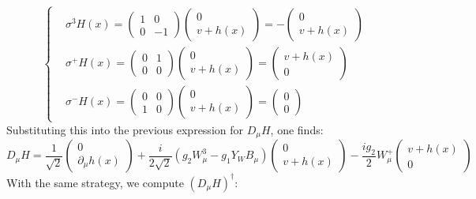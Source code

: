 \documentclass[../main.tex]{subfiles}
\begin{document}
\[
\left\{
\begin{aligned}
&\sigma^3H(x)=\left(\begin{array}{cc}
    1 & 0 \\
    0 & -1
\end{array}\right)\left(\begin{array}{c}
  0 \\
  v+h(x)
\end{array}\right)=-\left(\begin{array}{c}
  0 \\
  v+h(x)
\end{array}\right) \\
&\sigma^+H(x)=\left(\begin{array}{cc}
    0 & 1 \\
    0 & 0
\end{array}\right)\left(\begin{array}{c}
  0 \\
  v+h(x)
\end{array}\right)=\left(\begin{array}{c}
  v+h(x) \\
  0
\end{array}\right) \\
&\sigma^-H(x)=\left(\begin{array}{cc}
    0 & 0 \\
    1 & 0
\end{array}\right)\left(\begin{array}{c}
  0 \\
  v+h(x)
\end{array}\right)=\left(\begin{array}{c}
  0 \\
  0
\end{array}\right)
\end{aligned}
\right.
\]
Substituting this into the previous expression for $D_\mu H$, one finds:
\[
D_\mu H=\frac{1}{\sqrt{2}}\begin{pmatrix}0 \\ \partial_\mu h(x)\end{pmatrix}+\frac{i}{2\sqrt{2}}(g_2W_\mu^3-g_1Y_WB_\mu)\begin{pmatrix}0 \\ v+h(x)\end{pmatrix}-\frac{ig_2}{2}W_\mu^+\begin{pmatrix}v+h(x) \\ 0 \end{pmatrix}
\]
With the same strategy, we compute $(D_\mu H)^\dagger$:
\end{document}
